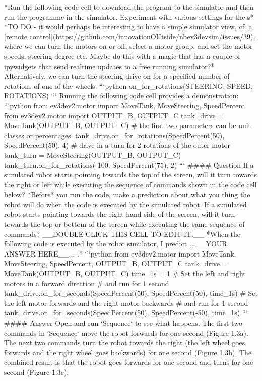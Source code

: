 \documentclass[letterpaper,10pt,english]{sphinxmanual}
\begin{document}
{*Run the following code cell to download the program to the simulator and then run the programme in the simulator. Experiment with various settings for the s*
*TO DO - it would perhaps be interesting to have a simple simulator view, cf. a [remote control](https://github.com/innovationOUtside/nbev3devsim/issues/39), where we can turn the motors on or off, select a motor group, and set the motor speeds, steering degree etc. Maybe do this with a magic that has a couple of ipywidgets that send realtime updates to a free running simulator?*
Alternatively, we can turn the steering drive on for a specified number of rotations of one of the wheels:
```python
on_for_rotations(STEERING, SPEED, ROTATIONS)
```
Running the following code cell provides a demonstration:
```python
from ev3dev2.motor import MoveTank, MoveSteering, SpeedPercent
from ev3dev2.motor import OUTPUT_B, OUTPUT_C
tank_drive = MoveTank(OUTPUT_B, OUTPUT_C)
# the first two parameters can be unit classes or percentages.
tank_drive.on_for_rotations(SpeedPercent(50), SpeedPercent(50), 4)
# drive in a turn for 2 rotations of the outer motor
tank_turn = MoveSteering(OUTPUT_B, OUTPUT_C)
tank_turn.on_for_rotations(-100, SpeedPercent(75), 2)
```
#### Question
If a simulated robot starts pointing towards the top of the screen, will it turn towards the right or left while executing the sequence of commands shown in the code cell below?
*Before* you run the code, make a prediction about what you thing the robot will do when the code is executed by the simulated robot.
If a simulated robot starts pointing towards the right hand side of the screen, will it turn towards the top or bottom of the screen while executing the same sequence of commands?
__DOUBLE CLICK THIS CELL TO EDIT IT.__
*When the following code is executed by the robot simulator, I predict ...__YOUR ANSWER HERE__... .*
```python
from ev3dev2.motor import MoveTank, MoveSteering, SpeedPercent, OUTPUT_B, OUTPUT_C
tank_drive = MoveTank(OUTPUT_B, OUTPUT_C)
time_1s = 1
# Set the left and right motors in a forward direction
# and run for 1 second
tank_drive.on_for_seconds(SpeedPercent(50), SpeedPercent(50), time_1s)
# Set the left motor forwards and the right motor backwards
# and run for 1 second
tank_drive.on_for_seconds(SpeedPercent(50), SpeedPercent(-50), time_1s)
```
#### Answer
Open and run `Sequence` to see what happens.
The first two commands in `Sequence` move the robot forwards for one second (Figure 1.3a). The next two commands turn the robot towards the right (the left wheel goes forwards and the right wheel goes backwards) for one second (Figure 1.3b). The combined result is that the robot goes forwards for one second and turns for one second (Figure 1.3c).
}
\end{document}
